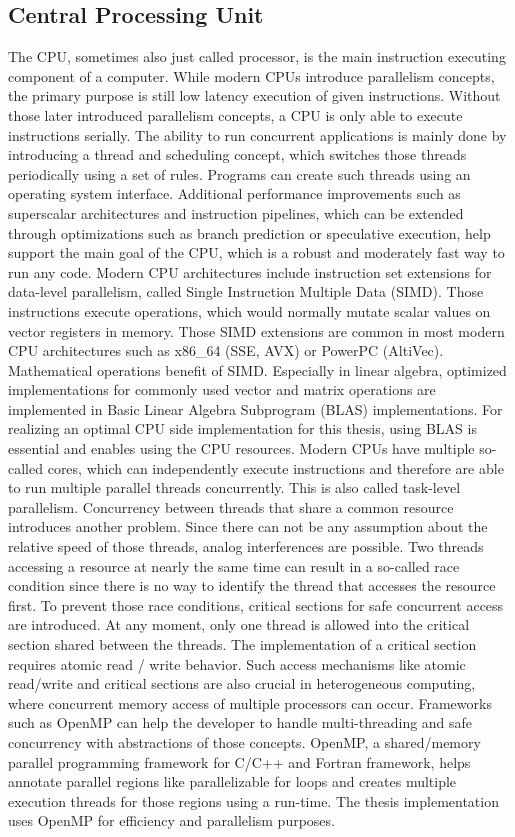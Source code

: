 \subsection{Central Processing Unit}
The CPU, sometimes also just called processor, is the main instruction executing component of a computer. While modern CPUs introduce parallelism concepts, the primary purpose is still low latency execution of given instructions.
Without those later introduced parallelism concepts, a CPU is only able to execute instructions serially. The ability to run concurrent applications is mainly done by introducing a thread and scheduling concept, which switches those threads periodically using a set of rules. Programs can create such threads using an operating system interface.
Additional performance improvements such as superscalar architectures and instruction pipelines, which can be extended through optimizations such as branch prediction or speculative execution, help support the main goal of the CPU, which is a robust and moderately fast way to run any code.
Modern CPU architectures include instruction set extensions for data-level parallelism, called Single Instruction Multiple Data (SIMD). Those instructions execute operations, which would normally mutate scalar values on vector registers in memory. Those SIMD extensions are common in most modern CPU architectures such as x86\_64 (SSE, AVX) or PowerPC (AltiVec). Mathematical operations benefit of SIMD. Especially in linear algebra, optimized implementations for commonly used vector and matrix operations are implemented in Basic Linear Algebra Subprogram (BLAS) implementations. For realizing an optimal CPU side implementation for this thesis, using BLAS is essential and enables using the CPU resources.
Modern CPUs have multiple so-called cores, which can independently execute instructions and therefore are able to run multiple parallel threads concurrently. This is also called task-level parallelism.
Concurrency between threads that share a common resource introduces another problem. Since there can not be any assumption about the relative speed of those threads, analog interferences are possible. Two threads accessing a resource at nearly the same time can result in a so-called race condition since there is no way to identify the thread that accesses the resource first. To prevent those race conditions, critical sections for safe concurrent access are introduced. At any moment, only one thread is allowed into the critical section shared between the threads. The implementation of a critical section requires atomic read / write behavior.
Such access mechanisms like atomic read/write and critical sections are also crucial in heterogeneous computing, where concurrent memory access of multiple processors can occur.
Frameworks such as OpenMP can help the developer to handle multi-threading and safe concurrency with abstractions of those concepts. OpenMP, a shared/memory parallel programming framework for C/C++ and Fortran framework, helps annotate parallel regions like parallelizable for loops and creates multiple execution threads for those regions using a run-time.
The thesis implementation uses OpenMP for efficiency and parallelism purposes.

